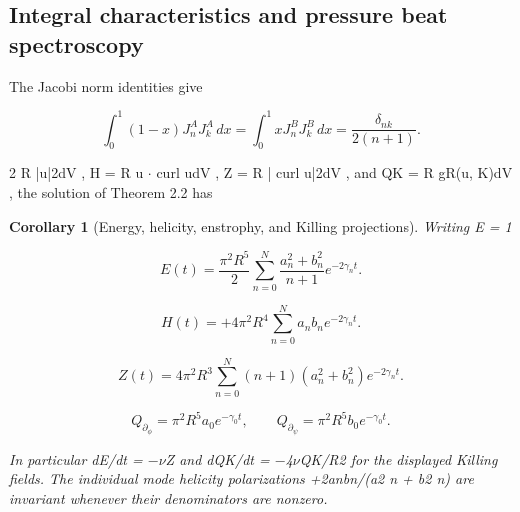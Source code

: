 \documentclass[10pt,letterpaper]{article}
\newtheorem{corollary}[theorem]{Corollary}
\theoremstyle{remark}
\begin{document}
\subsection{Integral characteristics and pressure beat spectroscopy}

The Jacobi norm identities give



\begin{equation}
\tag{13}\label{eq:13}
\int_0^1(1-x)J_n^AJ_k^A\,dx=\int_0^1xJ_n^BJ_k^B\,dx=\frac{\delta_{nk}}{2(n+1)}.
\end{equation}

2 R |u|2dV , H = R u \(\cdot \) curl udV , Z = R | curl u|2dV , and QK = R gR(u, K)dV , the solution of Theorem 2.2 has


\begin{corollary}[Energy, helicity, enstrophy, and Killing projections]

Writing E = 1


\begin{equation}
\tag{14}\label{eq:14}
E(t)=\frac{\pi^2R^5}2\sum_{n=0}^N\frac{a_n^2+b_n^2}{n+1}e^{-2\gamma_nt}.
\end{equation}


\begin{equation}
\tag{15}\label{eq:15}
H(t)=+4\pi^2R^4\sum_{n=0}^N a_nb_ne^{-2\gamma_nt}.
\end{equation}


\begin{equation}
\tag{16}\label{eq:16}
Z(t)=4\pi^2R^3\sum_{n=0}^N(n+1)(a_n^2+b_n^2)e^{-2\gamma_nt}.
\end{equation}


\begin{equation}
\tag{17}\label{eq:17}
Q_{\partial_\phi}=\pi^2R^5a_0e^{-\gamma_0t},\qquad Q_{\partial_\psi}=\pi^2R^5b_0e^{-\gamma_0t}.
\end{equation}

In particular dE/dt = \(- \nu \)Z and dQK/dt = \(- \)4\(\nu \)QK/R2 for the displayed Killing fields. The individual mode helicity polarizations +2anbn/(a2 n + b2 n) are invariant whenever their denominators are nonzero.


\end{corollary}
\end{document}
